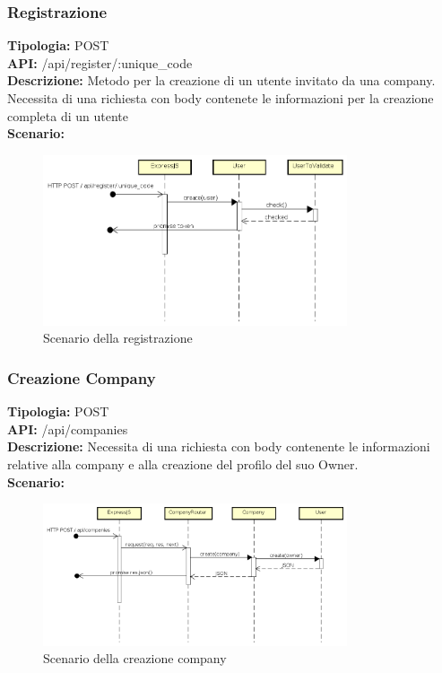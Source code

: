 \subsubsection{Registrazione}
\textbf{Tipologia:} POST \\
\textbf{API:} /api/register/:unique\_code \\
\textbf{Descrizione:} Metodo per la creazione di un utente invitato da una company. Necessita di una richiesta con body contenete le informazioni per la creazione completa di un utente \\
\textbf{Scenario:} 
\begin{figure}[h]
\centering
\includegraphics[width=0.8\textwidth]{res/sections/backend/(POST)register.png}
\caption{Scenario della registrazione}
\end{figure}

\newpage
\subsubsection{Creazione Company}
\textbf{Tipologia:} POST \\
\textbf{API:} /api/companies \\
\textbf{Descrizione:} Necessita di una richiesta con body contenente le informazioni relative alla company e alla creazione del profilo del suo Owner. \\
\textbf{Scenario:} 
\begin{figure}[h]
\centering
\includegraphics[width=0.8\textwidth]{res/sections/backend/(POST)company.png}
\caption{Scenario della creazione company}
\end{figure}

